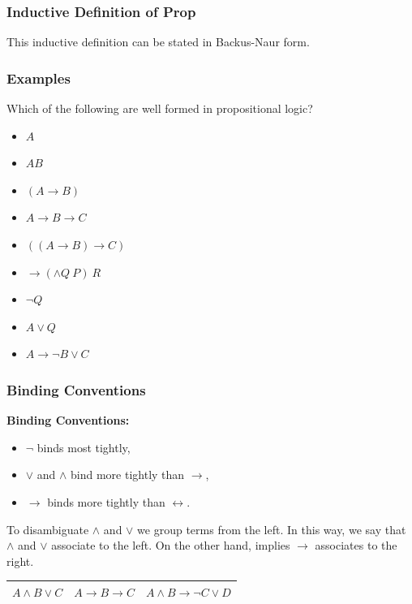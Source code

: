 \documentclass{beamer}
\begin{document}
\begin{frame}
	\frametitle{Inductive Definition of Prop}

	This inductive definition can be stated in Backus-Naur form.

	\vspace{70mm}

\end{frame}

\begin{frame}
	\frametitle{Examples}
	Which of the following are well formed in propositional logic?
	
	\begin{itemize}
		\item[1.] $A$
		\item[2.] $AB$
		\item[3.] $(A \rightarrow B)$
		\item[4.] $A \rightarrow B \rightarrow C$
		\item[5.] $((A \rightarrow B) \rightarrow C)$
		\item[6.] $\to (\land Q \ P) \ R$
		\item[7.] $\lnot Q$
		\item[8.] $A \lor Q$
		\item[9.] $A \rightarrow \lnot B \lor C$		
	\end{itemize}
\end{frame}


\begin{frame}
	\frametitle{Binding Conventions}
			
	{\bf Binding Conventions:} %
	\begin{itemize}
		\item $\lnot$ binds most tightly, 
		\item $\lor$ and $\land$ bind more tightly than $\rightarrow$,
		\item $\rightarrow$ binds more tightly than $\leftrightarrow$. 			
	\end{itemize}

	To disambiguate $\land$ and $\lor$ we group terms from the left. In this way, we say that $\land$ and $\lor$ associate to the left. On the other hand, implies $\to$ associates to the right.

	\begin{table}[h]
		\centering
		\begin{tabular}{c c c}
			$A \land B \lor C$ \hspace{10mm} & $A \to B \to C$ \hspace{10mm} & $A \land B \to \lnot C \lor D$ \\
			\hline
		\end{tabular}
	\end{table}

	\vspace{40mm}

\end{frame}
\end{document}
